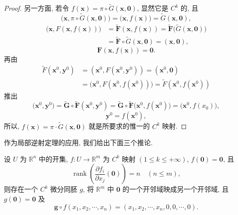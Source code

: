 \begin{proof}
另一方面, 若令 $f(\boldsymbol{x}) = \pi \circ \widetilde{G}(\boldsymbol{x}, \boldsymbol{0})$, 显然它是 $C^{k}$ 的, 且
\[
  \bigl(\boldsymbol{x}, \pi \circ \widetilde{G}(\boldsymbol{x}, \boldsymbol{0})\bigr) = \bigl(\boldsymbol{x}, f(\boldsymbol{x})\bigr) = \widetilde{G}(\boldsymbol{x}, \boldsymbol{0}),
\]
\begin{align*}
  \bigl(\boldsymbol{x}, F(\boldsymbol{x}, f(\boldsymbol{x}))\bigr) &= \widetilde{\boldsymbol{F}}(\boldsymbol{x}, f(\boldsymbol{x})) = \widetilde{\boldsymbol{F}}\bigl(\widetilde{G}(\boldsymbol{x}, \boldsymbol{0})\bigr) \\
  &= \widetilde{\boldsymbol{F}} \circ \widetilde{G}(\boldsymbol{x}, \boldsymbol{0}) = (\boldsymbol{x}, \boldsymbol{0}),
\end{align*}
\[
  \boldsymbol{F}(\boldsymbol{x}, f(\boldsymbol{x})) = \boldsymbol{0}.
\]
再由
\begin{align*}
  \widetilde{F}(\boldsymbol{x}^{0}, \boldsymbol{y}^{0}) &= (\boldsymbol{x}^{0}, F(\boldsymbol{x}^{0}, \boldsymbol{y}^{0})) = (\boldsymbol{x}^{0}, \boldsymbol{0}) \\
  &= \bigl(\boldsymbol{x}^{0}, F(\boldsymbol{x}^{0}, f(\boldsymbol{x}^{0}))\bigr) = \widetilde{F}(\boldsymbol{x}^{0}, f(\boldsymbol{x}^{0}))
\end{align*}
推出
\[
  \bigl(\boldsymbol{x}^{0}, \boldsymbol{y}^{0}\bigr) = \widetilde{\boldsymbol{G}} \circ \widetilde{\boldsymbol{F}}(\boldsymbol{x}^{0}, \boldsymbol{y}^{0}) = \widetilde{\boldsymbol{G}} \circ \widetilde{\boldsymbol{F}}\bigl(\boldsymbol{x}^{0}, f(\boldsymbol{x}^{0})\bigr) = \bigl(\boldsymbol{x}^{0}, f(x_{0})\bigr),
\]
\[
  \boldsymbol{y}^{0} = f(\boldsymbol{x}^{0}),
\]
所以, $f(\boldsymbol{x}) = \pi \cdot \widetilde{G}(\boldsymbol{x}, \boldsymbol{0})$ 就是所要求的惟一的 $C^{k}$ 映射.
\end{proof}

作为局部逆射定理的应用, 我们给出下面三个推论.

\begin{corollary}\label{cor:8.5.1}
设 $U$ 为 $\mathbb{R}^{n}$ 中的开集, $f: U \to \mathbb{R}^{m}$ 为 $C^{k}$ 映射 $(1 \leqslant k \leqslant +\infty)$, $f(\boldsymbol{0}) = \boldsymbol{0}$, 且
\[
  \operatorname{rank}\left(\frac{\partial f_{i}}{\partial x_{j}}(\boldsymbol{0})\right) = n \quad (n \leqslant m),
\]
则存在一个 $C^{k}$ 微分同胚 $g$, 将 $\mathbb{R}^{m}$ 中 $\boldsymbol{0}$ 的一个开邻域映成另一个开邻域, 且 $g(\boldsymbol{0}) = \boldsymbol{0}$ 及
\[
  \boldsymbol{g} \circ f(x_{1}, x_{2}, \cdots, x_{n}) = (x_{1}, x_{2}, \cdots, x_{n}, 0, 0, \cdots, 0).
\]
\end{corollary}


